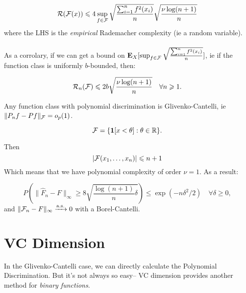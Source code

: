 \documentclass{article}
\begin{document}
\begin{theorem}
$$\mathcal R(\mathcal F(x)) \leqslant 4 \sup_{f\in \mathcal F} \sqrt{\frac{\sum_{i=1}^n f^2(x_i)}{n}} \sqrt{\frac{\nu \log(n+1)}{n}}$$
where the LHS is the \textit{empirical} Rademacher complexity (ie a random variable).\\\\

As a corrolary, if we can get a bound on $\mathbf{E}_X[\sup_{f\in \mathcal F} \sqrt{\frac{\sum_{i=1}^n f^2(x_i)}{n}} ]$, ie if the function class is uniformly $b$-bounded, then:

$$\mathcal R_n(\mathcal F) \leqslant 2b \sqrt{\frac{\nu \log (n+1)}{n}} \quad \forall n\geqslant 1.$$
\end{theorem}

\begin{fact}
Any function class with polynomial discrimination is Glivenko-Cantelli, ie $\|P_n f - Pf\|_\mathcal F = o_p(1)$. 
\end{fact}

\begin{example}
$$\mathcal F = \{ \boldsymbol{1}[x<\theta] : \theta\in\mathbb R\}.$$

Then
$$|\mathcal F(x_1,\ldots,x_n)| \leqslant n+1$$
Which means that we have polynomial complexity of order $\nu=1$. As a result:

$$P(\|\hat F_n - F\|_\infty \geq 8\sqrt{\frac{\log(n+1)}{n} \delta } ) \leq \exp(-n\delta^2/2) \quad \forall \delta\geq 0,$$
and $\|\mathcal F_n - F\|_\infty \xrightarrow{\mathrm{a.s.}} 0$ with a Borel-Cantelli. 


\end{example}

\section{VC Dimension}
In the Glivenko-Cantelli case, we can directly calculate the Polynomial Discrimination. But it's not always so easy-- VC dimension provides another method for \textit{binary functions}.
\end{document}
